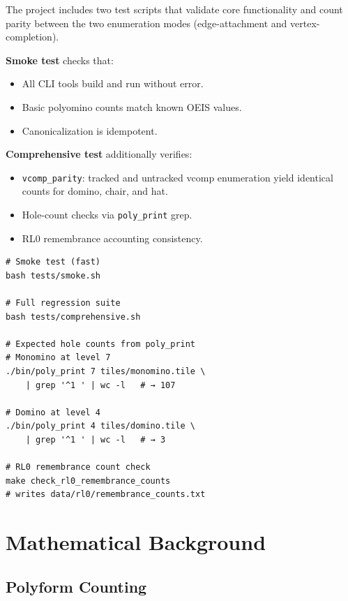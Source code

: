 \documentclass[10pt,a4paper]{article}
\newcommand{\code}[1]{\texttt{\small #1}}
\newcommand{\file}[1]{\texttt{\footnotesize #1}}
\begin{document}
\begin{tcolorbox}[dualbox, title=Test Suite — \file{tests/}]
  The project includes two test scripts that validate core
  functionality and count parity between the two enumeration modes
  (edge-attachment and vertex-completion).

  \textbf{Smoke test} checks that:
  \begin{itemize}
    \item All CLI tools build and run without error.
    \item Basic polyomino counts match known OEIS values.
    \item Canonicalization is idempotent.
  \end{itemize}

  \textbf{Comprehensive test} additionally verifies:
  \begin{itemize}
    \item \code{vcomp\_parity}: tracked and untracked vcomp
      enumeration yield identical counts for domino, chair, and hat.
    \item Hole-count checks via \code{poly\_print} grep.
    \item RL0 remembrance accounting consistency.
  \end{itemize}
\tcblower
\begin{verbatim}
# Smoke test (fast)
bash tests/smoke.sh

# Full regression suite
bash tests/comprehensive.sh

# Expected hole counts from poly_print
# Monomino at level 7
./bin/poly_print 7 tiles/monomino.tile \
    | grep '^1 ' | wc -l   # → 107

# Domino at level 4
./bin/poly_print 4 tiles/domino.tile \
    | grep '^1 ' | wc -l   # → 3

# RL0 remembrance count check
make check_rl0_remembrance_counts
# writes data/rl0/remembrance_counts.txt
\end{verbatim}
\end{tcolorbox}

\section{Mathematical Background}

\subsection{Polyform Counting}
\end{document}
